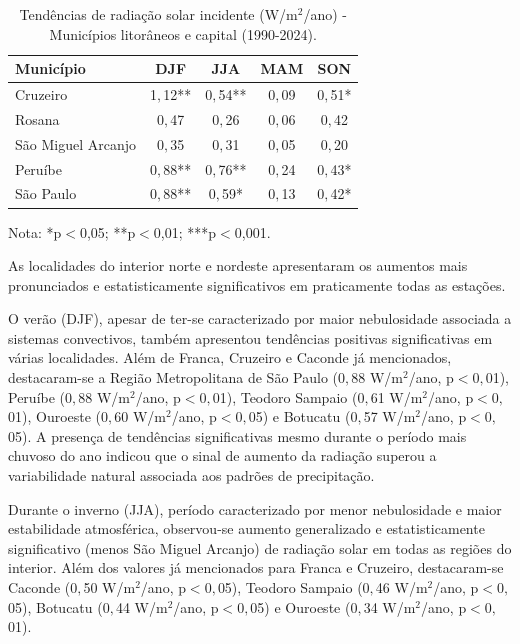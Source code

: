 \begin{table}[H]
	\centering
	\caption{Tendências de radiação solar incidente (W/m$^2$/ano) - Municípios litorâneos e capital (1990-2024).}
	\label{tab:tendencias_radiacao_sp_b}
	\small
	\begin{tabular}{lcccc}
		\hline
		\textbf{Município} & \textbf{DJF} & \textbf{JJA} & \textbf{MAM} & \textbf{SON} \\
		\hline
		Cruzeiro& 1${,}$12** & 0${,}$54** & 0${,}$09& 0${,}$51*\\
		Rosana   & 0${,}$47& 0${,}$26& 0${,}$06& 0${,}$42\\
		São Miguel Arcanjo & 0${,}$35& 0${,}$31& 0${,}$05& 0${,}$20\\
		Peruíbe   & 0${,}$88** & 0${,}$76** & 0${,}$24& 0${,}$43*\\
		  São Paulo & 0${,}$88**& 0${,}$59*& 0${,}$13& 0${,}$42* 
		\hline
	\end{tabular}
	\vspace{2mm}
	
	{\footnotesize Nota: *p$<$0,05; **p$<$0,01; ***p$<$0,001.}
\end{table}

As localidades do interior norte e nordeste apresentaram os aumentos mais pronunciados e estatisticamente significativos em praticamente todas as estações.

O verão (DJF), apesar de ter-se caracterizado por maior nebulosidade associada a sistemas convectivos, também apresentou tendências positivas significativas em várias localidades. Além de Franca, Cruzeiro e Caconde já mencionados, destacaram-se a Região Metropolitana de São Paulo (0${,}$88 W/m$^2$/ano, p$<$0${,}$01), Peruíbe (0${,}$88 W/m$^2$/ano, p$<$0${,}$01), Teodoro Sampaio (0${,}$61 W/m$^2$/ano, p$<$0${,}$01), Ouroeste (0${,}$60 W/m$^2$/ano, p$<$0${,}$05) e Botucatu (0${,}$57 W/m$^2$/ano, p$<$0${,}$05). A presença de tendências significativas mesmo durante o período mais chuvoso do ano indicou que o sinal de aumento da radiação superou a variabilidade natural associada aos padrões de precipitação.

Durante o inverno (JJA), período caracterizado por menor nebulosidade e maior estabilidade atmosférica, observou-se aumento generalizado e estatisticamente significativo (menos São Miguel Arcanjo) de radiação solar em todas as regiões do interior. Além dos valores já mencionados para Franca e Cruzeiro, destacaram-se Caconde (0${,}$50 W/m$^2$/ano, p$<$0${,}$05), Teodoro Sampaio (0${,}$46 W/m$^2$/ano, p$<$0${,}$05), Botucatu (0${,}$44 W/m$^2$/ano, p$<$0${,}$05) e Ouroeste (0${,}$34 W/m$^2$/ano, p$<$0${,}$01).

